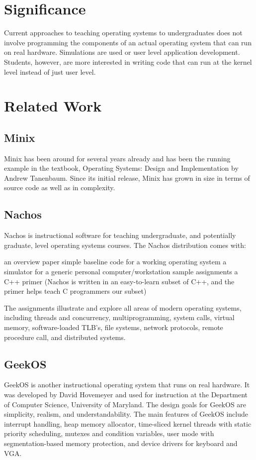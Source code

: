 \documentclass{acm_proc_article-sp}
\begin{document}
\section{Significance}
Current approaches to teaching operating systems to undergraduates does not
involve programming the components of an actual operating system that can run
on real hardware. Simulations are used or user level application development.
Students, however, are more interested in writing code that can run at the
kernel level instead of just user level. 

\section{Related Work}

\subsection{Minix}
Minix has been around for several years already and has been the running 
example in the textbook, Operating Systems: Design and Implementation by 
Andrew Tanenbaum. Since its initial release, Minix has grown in size in terms
of source code as well as in complexity. 

\subsection{Nachos}
Nachos is instructional software for teaching undergraduate, and potentially
graduate, level operating systems courses. The Nachos distribution
comes with: 

   an overview paper
   simple baseline code for a working operating system
   a simulator for a generic personal computer/workstation
   sample assignments
   a C++ primer (Nachos is written in an easy-to-learn subset of C++, 
     and the primer helps teach C programmers our subset)

The assignments illustrate and explore all areas of modern operating
systems, including threads and concurrency, multiprogramming, 
system calls, virtual memory, software-loaded TLB's, file systems, 
network protocols, remote procedure call, and distributed systems.


\subsection{GeekOS}

GeekOS is another instructional operating system that runs on real hardware. 
It was developed by David Hovemeyer and used for instruction at the Department 
of Computer Science, University of Maryland. The design goals for GeekOS are
simplicity, realism, and understandability. The main features of GeekOS include interrupt handling, heap memory allocator, time-sliced kernel threads with 
static priority scheduling, mutexes and condition variables, user mode 
with segmentation-based memory protection, and device drivers for keyboard 
and VGA.
\end{document}
